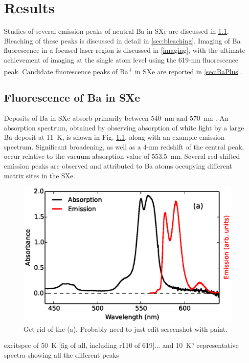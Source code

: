 \chapter{Results}

Studies of several emission peaks of neutral Ba in SXe are discussed in \ref{sec:fluorescence}.  Bleaching of these peaks is discussed in detail in \ref{sec:bleaching}.  Imaging of Ba fluorescence in a focused laser region is discussed in \ref{imaging}, with the ultimate achievement of imaging at the single atom level using the 619-nm fluorescence peak.  Candidate fluorescence peaks of Ba\textsuperscript{+} in SXe are reported in \ref{sec:BaPlus}.

\section{Fluorescence of Ba in SXe}
\label{sec:fluorescence}

Deposits of Ba in SXe absorb primarily between 540~nm and 570~nm \cite{Mong2015,Brian,Shon}.  An absorption spectrum, obtained by observing absorption of white light by a large Ba deposit at 11~K, is shown in Fig. \ref{fig:BaAbs}, along with an example emission spectrum.  Significant broadening, as well as a 4-nm redshift  of the central peak, occur relative to the vacuum absorption value of 553.5~nm.  Several red-shifted emission peaks are observed and attributed to Ba atoms occupying different matrix sites in the SXe.

\begin{figure} %
        \centering
                \includegraphics[width=.7\textwidth]{figures/BaAbs_fromBaSpec.eps}
                \caption{\color{red}Get rid of the (a).  Probably need to just edit screenshot with paint.  \cite{Mong2015}}
\label{fig:BaAbs}
\end{figure}

excitspec of 50~K [fig of all, including r110 of 619]... and 10~K?  representative spectra showing all the different peaks

